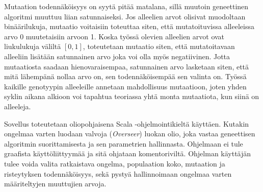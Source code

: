 Mutaation todennäköisyys on syytä pitää matalana, sillä muutoin geneettinen algoritmi muuttuu liian satunnaiseksi.
Jos alleelien arvot olisivat muodoltaan binäärilukuja, mutaatio voitaisiin toteuttaa siten, että mutatoituvissa
alleeleissa arvo 0 muutetaisiin arvoon 1. Koska työssä olevien alleelien arvot ovat liukulukuja väliltä \([0,1]\),
toteutetaan mutaatio siten, että mutatoitavaan alleeliin lisätään satunnainen arvo joka voi olla myös negatiivinen.
Jotta mutaatiosta saadaan hienovaraisempaa, satunnainen arvo lasketaan siten,
että mitä lähempänä nollaa arvo on, sen todennäköisempää sen valinta on.
Työssä kaikille genotyypin alleeleille annetaan mahdollisuus mutaatioon,
joten yhden syklin aikana alkioon voi tapahtua teoriassa yhtä monta mutaatiota, kun siinä on alleeleja.

Sovellus toteutetaan oliopohjaisena Scala -ohjelmointikieltä käyttäen. Kutakin ongelmaa varten luodaan valvoja (\textit{Overseer})
luokan olio, joka vastaa geneettisen algoritmin suorittamisesta ja sen parametrien hallinnasta.
Ohjelmaan ei tule graafista käyttöliittyymää ja sitä ohjataan komentoriviltä.
Ohjelman käyttäjän tulee voida valita ratkaistava ongelma, populaation koko,
mutaation ja risteytyksen todennäköisyys, sekä pystyä hallinnoimaan ongelmaa varten määriteltyjen muuttujien arvoja.
